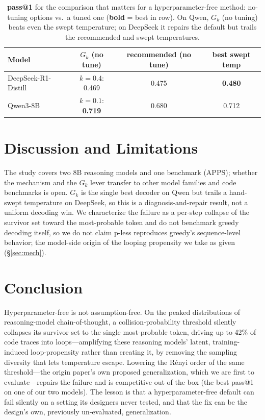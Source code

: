 \documentclass[11pt]{article}                       %
\begin{document}
\begin{table}[t]\centering
\caption{\textbf{pass@1} for the comparison that matters for a hyperparameter-free method: no-tuning
options vs.\ a tuned one (\textbf{bold} = best in row). On Qwen, $G_k$ (no tuning) beats even the swept
temperature; on DeepSeek it repairs the default but trails the recommended and swept temperatures.}
\label{tab:pos}
\begin{tabular}{lccc}
\toprule
Model & $G_k$ (no tune) & recommended (no tune) & best swept temp \\
\midrule
DeepSeek-R1-Distill & $k{=}0.4$: 0.469 & 0.475 & \textbf{0.480} \\
Qwen3-8B            & $k{=}0.1$: \textbf{0.719} & 0.680 & 0.712 \\
\bottomrule
\end{tabular}
\end{table}

\section{Discussion and Limitations}\label{sec:disc}
The study covers two 8B reasoning models and one benchmark (APPS); whether the mechanism and the
$G_k$ lever transfer to other model families and code benchmarks is open. $G_k$ is the single best
decoder on Qwen but trails a hand-swept temperature on DeepSeek, so this is a diagnosis-and-repair
result, not a uniform decoding win.
We characterize the failure as a per-step collapse of the survivor set toward the most-probable token
and do not benchmark greedy decoding itself, so we do not claim p-less reproduces greedy's
sequence-level behavior; the model-side origin of the looping propensity we take as given (\S\ref{sec:mech}).

\section{Conclusion}\label{sec:conc}
Hyperparameter-free is not assumption-free. On the peaked distributions of reasoning-model
chain-of-thought, a collision-probability threshold silently collapses its survivor set to the single
most-probable token, driving up to 42\% of code traces into loops---amplifying these reasoning models'
latent, training-induced loop-propensity rather than creating it, by removing the sampling diversity
that lets temperature escape. Lowering the R\'enyi order of the same threshold---the origin paper's own
proposed generalization, which we are first to evaluate---repairs the failure and is competitive out of
the box (the best pass@1 on one of our two models). The lesson is that a hyperparameter-free
default can fail silently on a setting its designers never tested, and that the fix can be the design's
own, previously un-evaluated, generalization.
\end{document}
